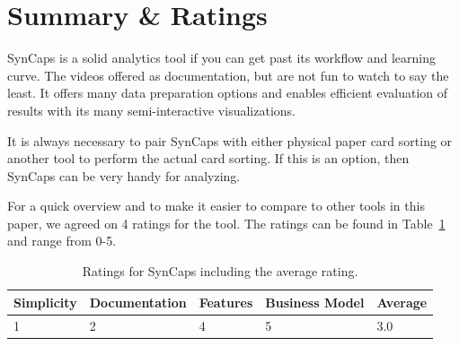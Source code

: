\section{Summary \& Ratings} SynCaps is a solid analytics tool if you
can get past its workflow and learning curve. The videos offered as
documentation, but are not fun to watch to say the least. It offers
many data preparation options and enables efficient evaluation of
results with its many semi-interactive  visualizations.

It is always necessary to pair SynCaps with either physical paper card
sorting or another tool to perform the actual card sorting. If this is
an option, then SynCaps can be very handy for analyzing.

For a quick overview and to make it easier to compare to other tools
in this paper, we agreed on 4 ratings for the tool. The ratings can be
found in Table~\ref{tab:rating-SynCaps} and range from 0-5.

\begin{table}[tp] 
\centering 
\begin{tabularx}{\linewidth}{|X|X|X|X|X|}
\hline
Simplicity & Documentation & Features & Business Model & Average \\ 
\hline 
1 & 2 & 4 & 5 & 3.0 \\ 
\hline 
\end{tabularx} 
\caption[Ratings for SynCaps] {
Ratings for SynCaps including the average rating.
} 
\label{tab:rating-SynCaps}
\end{table}